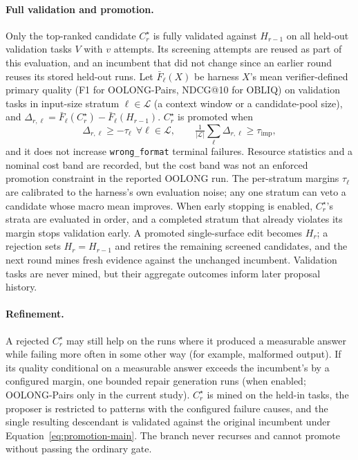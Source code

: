 \paragraph{Full validation and promotion.}
Only the top-ranked candidate $C_r^\star$ is fully validated against
$H_{r-1}$ on all held-out validation tasks $V$ with $v$ attempts. Its
screening attempts are reused as part of this evaluation, and an incumbent
that did not change since an earlier round reuses its stored held-out runs.
Let $\bar F_\ell(X)$ be harness $X$'s mean verifier-defined primary quality
(F1 for OOLONG-Pairs, NDCG@10 for OBLIQ) on validation tasks in input-size
stratum $\ell\in\mathcal{L}$ (a context window or a candidate-pool size), and
$\Delta_{r,\ell}=\bar F_\ell(C_r^\star)-\bar F_\ell(H_{r-1})$.
$C_r^\star$ is promoted when
\begin{equation}
\Delta_{r,\ell}\geq-\tau_\ell\ \ \forall \ell\in\mathcal{L},\qquad
\tfrac{1}{|\mathcal{L}|}\textstyle\sum_{\ell}\Delta_{r,\ell}\geq\tau_{\mathrm{imp}},
\label{eq:promotion-main}
\end{equation}
and it does not increase \texttt{wrong\_format} terminal failures. Resource
statistics and a nominal cost band are recorded, but the cost band was not an
enforced promotion constraint in the reported OOLONG run. The per-stratum
margins $\tau_\ell$ are calibrated to the
harness's own evaluation noise; any one stratum can veto a candidate whose
macro mean improves. When early stopping is enabled, $C_r^\star$'s strata are
evaluated in order, and a completed stratum that already violates its margin
stops validation early.
A promoted single-surface edit becomes $H_r$; a rejection sets
$H_r=H_{r-1}$ and retires
the remaining screened candidates, and the next round mines fresh evidence
against the unchanged incumbent. Validation tasks are never mined, but their
aggregate outcomes inform later proposal history.

\paragraph{Refinement.}
A rejected $C_r^\star$ may still help on the runs where it produced a measurable
answer while failing more often in some other way (for example, malformed
output). If its quality conditional on a measurable answer exceeds the
incumbent's by a configured margin, one bounded repair generation runs (when
enabled; OOLONG-Pairs only in the current study). $C_r^\star$ is mined
on the held-in tasks, the proposer is restricted to patterns with the
configured failure causes, and the single resulting descendant is validated
against the original incumbent under Equation~\ref{eq:promotion-main}. The
branch never recurses and cannot promote without passing the ordinary gate.


